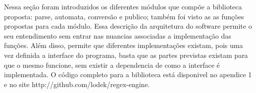 Nessa seção foram introduzidos os diferentes módulos que compõe a biblioteca proposta: parse, automata, conversão e publico; também foi visto as as funções propostas para cada módulo.
Essa descrição da arquitetura do software permite o seu entendimento sem entrar nas nuancias associadas a implementação das funções.
Além disso, permite que diferentes implementações existam, pois uma vez definida a interface do programa, basta que as partes previstas existam para que o mesmo funcione, sem existir a dependencia de como a interface é implementada.
O código completo para a biblioteca está disponivel no apendice 1 e no site http://github.com/lodek/regex-engine.
